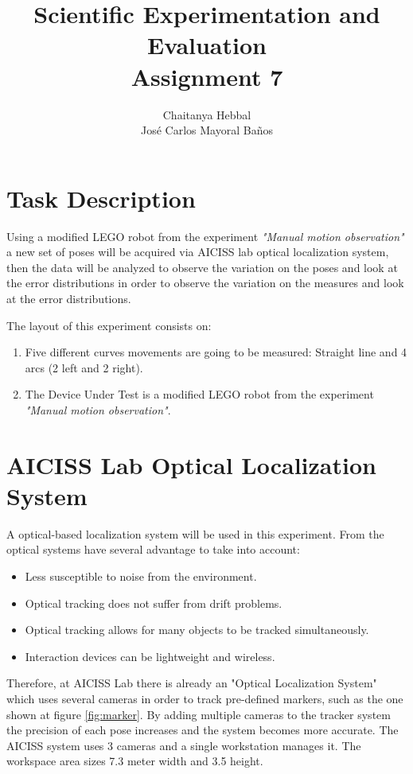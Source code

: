 \documentclass[10pt]{scrartcl}
\title{Scientific Experimentation and Evaluation\\
		\small{Assignment 7}}
\author{Chaitanya Hebbal\\
		Jos\'e Carlos Mayoral Ba\~nos}
\begin{document}
	\maketitle
\section{Task Description}

Using a modified LEGO robot from the experiment \textit{"Manual motion observation"} a new set of poses will be acquired via AICISS lab optical localization system, then the data will be analyzed to observe the variation on the poses and look at the error distributions in order to observe the variation on the measures and look at the error distributions.

The layout of this experiment consists on:
\begin{enumerate}
	\item Five different curves movements are going to be measured: Straight line and 4 arcs (2 left and 2 right).
	\item The Device Under Test is a modified LEGO robot from the experiment \textit{"Manual motion observation"}.
\end{enumerate}

\section{AICISS Lab Optical Localization System}

A optical-based localization system will be used in this experiment. From \cite{OptSystem} the optical systems have several advantage to take into account:

\begin{itemize}
\item Less susceptible to noise from the environment. 
\item Optical tracking does not suffer from drift problems.
\item Optical tracking allows for many objects to be tracked simultaneously.
\item Interaction devices can be lightweight and wireless. 
\end{itemize}



Therefore, at AICISS Lab there is already an "Optical Localization System" which uses several cameras in order to track pre-defined markers, such as the one shown at figure \ref{fig:marker}. By adding multiple cameras to the tracker system the precision of each pose increases and the system becomes more accurate. The AICISS system uses 3 cameras and a single workstation manages it. The workspace area sizes 7.3 meter width and 3.5 height.
\end{document}

